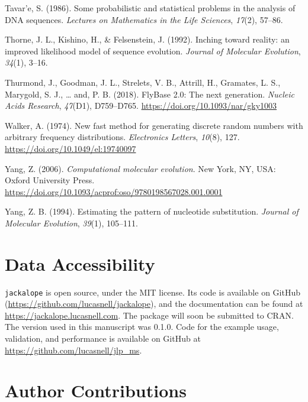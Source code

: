 \documentclass[12pt,]{article}
\begin{document}
\leavevmode\hypertarget{ref-Tavare_1986gtr}{}%
Tavar\a'e, S. (1986). Some probabilistic and statistical problems in the analysis of DNA sequences. \emph{Lectures on Mathematics in the Life Sciences}, \emph{17}(2), 57--86.

\leavevmode\hypertarget{ref-Thorne_1992}{}%
Thorne, J. L., Kishino, H., \& Felsenstein, J. (1992). Inching toward reality: an improved likelihood model of sequence evolution. \emph{Journal of Molecular Evolution}, \emph{34}(1), 3--16.

\leavevmode\hypertarget{ref-Thurmond_2018}{}%
Thurmond, J., Goodman, J. L., Strelets, V. B., Attrill, H., Gramates, L. S., Marygold, S. J., \ldots{} and, P. B. (2018). FlyBase 2.0: The next generation. \emph{Nucleic Acids Research}, \emph{47}(D1), D759--D765. \url{https://doi.org/10.1093/nar/gky1003}

\leavevmode\hypertarget{ref-Walker_1974}{}%
Walker, A. (1974). New fast method for generating discrete random numbers with arbitrary frequency distributions. \emph{Electronics Letters}, \emph{10}(8), 127. \url{https://doi.org/10.1049/el:19740097}

\leavevmode\hypertarget{ref-Yang_2006}{}%
Yang, Z. (2006). \emph{Computational molecular evolution}. New York, NY, USA: Oxford University Press. \url{https://doi.org/10.1093/acprof:oso/9780198567028.001.0001}

\leavevmode\hypertarget{ref-Yang_1994}{}%
Yang, Z. B. (1994). Estimating the pattern of nucleotide substitution. \emph{Journal of Molecular Evolution}, \emph{39}(1), 105--111.


\hypertarget{data-accessibility}{%
\section{Data Accessibility}\label{data-accessibility}}

\texttt{jackalope} is open source, under the MIT license.
Its code is available on GitHub
(\url{https://github.com/lucasnell/jackalope}), and
the documentation can be found at \url{https://jackalope.lucasnell.com}.
The package will soon be submitted to CRAN.
The version used in this manuscript was 0.1.0.
Code for the example usage, validation, and performance is available on GitHub at
\url{https://github.com/lucasnell/jlp_ms}.

\hypertarget{author-contributions}{%
\section{Author Contributions}\label{author-contributions}}
\end{document}

